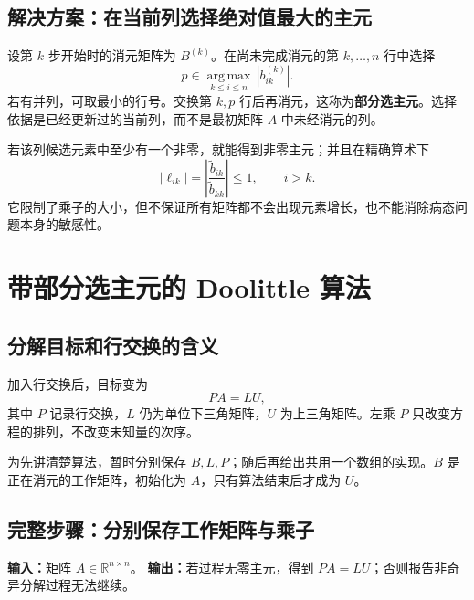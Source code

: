 \documentclass[UTF8,11pt,a4paper,fontset=fandol]{ctexart}
\newcommand{\R}{\mathbb{R}}
\begin{document}
\subsection{解决方案：在当前列选择绝对值最大的主元}
设第 $k$ 步开始时的消元矩阵为 $B^{(k)}$。在尚未完成消元的第 $k,\ldots,n$ 行中选择
\begin{equation}
p\in\underset{k\le i\le n}{\operatorname{arg\,max}}\,
|b^{(k)}_{ik}|.
\label{eq:pivot}
\end{equation}
若有并列，可取最小的行号。交换第 $k,p$ 行后再消元，这称为\textbf{部分选主元}。选择依据是已经更新过的当前列，而不是最初矩阵 $A$ 中未经消元的列。

若该列候选元素中至少有一个非零，就能得到非零主元；并且在精确算术下
\[
|\ell_{ik}|=\left|\frac{\widetilde b_{ik}}{\widetilde b_{kk}}\right|\le1,
\qquad i>k.
\]
它限制了乘子的大小，但不保证所有矩阵都不会出现元素增长，也不能消除病态问题本身的敏感性。

\section{带部分选主元的 Doolittle 算法}
\subsection{分解目标和行交换的含义}
加入行交换后，目标变为
\[
\boxed{PA=LU},
\]
其中 $P$ 记录行交换，$L$ 仍为单位下三角矩阵，$U$ 为上三角矩阵。左乘 $P$ 只改变方程的排列，不改变未知量的次序。

为先讲清楚算法，暂时分别保存 $B,L,P$；随后再给出共用一个数组的实现。$B$ 是正在消元的工作矩阵，初始化为 $A$，只有算法结束后才成为 $U$。

\subsection{完整步骤：分别保存工作矩阵与乘子}
\textbf{输入：}矩阵 $A\in\R^{n\times n}$。\quad
\textbf{输出：}若过程无零主元，得到 $PA=LU$；否则报告非奇异分解过程无法继续。
\end{document}
